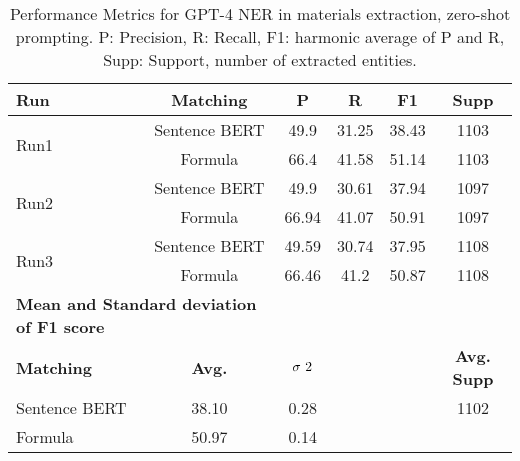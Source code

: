 \begin{table}[htbp]
\small
  \centering
  \caption{Performance Metrics for GPT-4 NER in materials extraction, zero-shot prompting. P: Precision, R: Recall, F1: harmonic average of P and R, Supp: Support, number of extracted entities.}
  \begin{tabular}{lccccc}
    \toprule
    \textbf{Run} & \textbf{Matching} & \textbf{P} & \textbf{R} & \textbf{F1} & \textbf{Supp} \\
    \midrule
    \multirow{2}{*}{Run1} & Sentence BERT & 49.9 & 31.25 & 38.43 & 1103 \\
    & Formula & 66.4 & 41.58 & 51.14& 1103 \\
    \midrule
    \multirow{2}{*}{Run2} & Sentence BERT & 49.9 & 30.61 & 37.94 & 1097 \\
    & Formula & 66.94 & 41.07 & 50.91 & 1097 \\
    \midrule
    \multirow{2}{*}{Run3} & Sentence BERT & 49.59 & 30.74 & 37.95 & 1108 \\
    & Formula & 66.46 & 41.2 & 50.87 & 1108 \\
    \midrule
    \multicolumn{2}{l}{\textbf{Mean and Standard deviation of F1 score}} & & & & \\
    \midrule
    \textbf{Matching} & \textbf{Avg.} & $\sigma\textsuperscript{2}$ & & & \textbf{Avg. Supp}\\
    Sentence BERT & 38.10 & 0.28 & & & 1102 \\
    Formula & 50.97 & 0.14 & & & \\
    \bottomrule
  \end{tabular}
\end{table}

